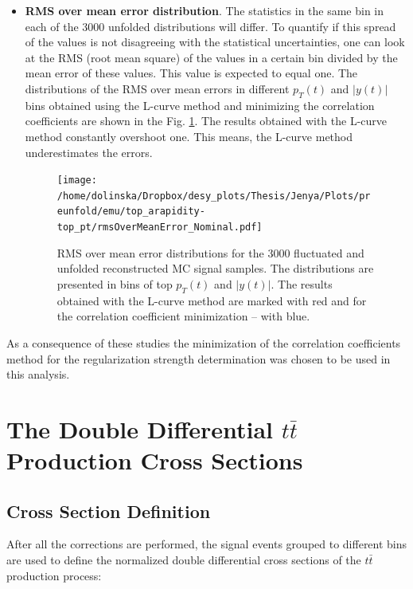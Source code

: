 \begin{itemize}
 \item \textbf{RMS over mean error distribution}. The statistics in the same bin in each of the 3000 unfolded
 distributions will differ. To quantify if this spread of the values is not disagreeing with the statistical uncertainties, one can look at the 
 RMS (root mean square) of the values in a certain bin divided by the mean error of these values. This value is expected to equal one.
 The distributions of the RMS over mean errors in different $p_{T}(t)$ and $|y(t)|$ bins obtained using the L-curve method and minimizing the 
 correlation coefficients are shown in the Fig. \ref{fig:RMSovMeanErr}. The results obtained with the L-curve method
 constantly overshoot one. This means, the L-curve method underestimates the errors.
 \begin{figure}[h]
  \centering
  \texttt{[image: /home/dolinska/Dropbox/desy\_plots/Thesis/Jenya/Plots/preunfold/emu/top\_arapidity-top\_pt/rmsOverMeanError\_Nominal.pdf]}
  \caption{RMS over mean error distributions for the 3000 fluctuated and unfolded reconstructed MC signal samples. The distributions are
         presented in bins of top $p_{T}(t)$ and $|y(t)|$. The results obtained with the L-curve method are marked with red and 
         for the correlation coefficient minimization -- with blue.}
  \label{fig:RMSovMeanErr}
 \end{figure}

\end{itemize}

As a consequence of these studies the minimization of the correlation coefficients method for the regularization strength determination was chosen
to be used in this analysis.

\section{The Double Differential $t\bar{t}$ Production Cross Sections}

\subsection{Cross Section Definition}\label{ssec:xsec_def}

After all the corrections are performed, the signal events grouped to different bins are used to define the normalized double differential cross sections
of the $t\bar{t}$ production process:

